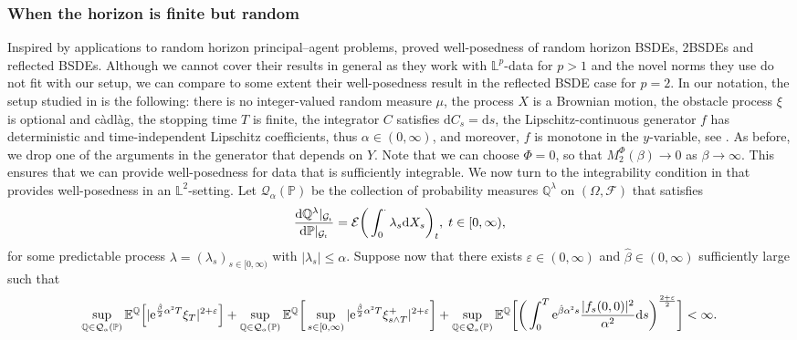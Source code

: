 \documentclass[10pt]{article} %
\newcommand\cE{\mathcal E}
\newcommand\cF{\mathcal F}
\newcommand\cG{\mathcal G}
\newcommand\cQ{\mathcal Q}
\newcommand{\smalltext}[1]{\text{\fontsize{4}{4}\selectfont$#1$}}
\def \E{\mathbb{E}}
\def \L{\mathbb{L}}
\def \P{\mathbb{P}}
\def \Q{\mathbb{Q}}
\newcommand{\1}{\mathbf{1}}
\def\d{\mathrm{d}}
\begin{document}
\subsubsection{When the horizon is finite but random}

Inspired by applications to random horizon principal--agent problems, \citeauthor*{lin2020second} \cite{lin2020second} proved well-posedness of random horizon BSDEs, 2BSDEs and reflected BSDEs. Although we cannot cover their results in general as they work with $\L^p$-data for $p > 1$ and the novel norms they use do not fit with our setup, we can compare to some extent their well-posedness result in the reflected BSDE case for $p = 2$. In our notation, the setup studied in \cite{lin2020second} is the following: there is no integer-valued random measure $\mu$, the process $X$ is a Brownian motion, the obstacle process $\xi$ is optional and c\`adl\`ag, the stopping time $T$ is finite, the integrator $C$ satisfies $\d C_s = \d s$, the Lipschitz-continuous generator $f$ has deterministic and time-independent Lipschitz coefficients, thus $\alpha \in (0,\infty)$, and moreover, $f$ is monotone in the $y$-variable, see \cite[Assumption 3.1.$(ii)$]{lin2020second}. As before, we drop one of the arguments in the generator that depends on $Y$. Note that we can choose $\Phi = 0$, so that $M^\Phi_2(\beta) \longrightarrow 0$ as $\beta \longrightarrow\infty$. This ensures that we can provide well-posedness for data that is sufficiently integrable. We now turn to the integrability condition in \cite{lin2020second} that provides well-posedness in an $\L^2$-setting. Let $\cQ_\alpha(\P)$ be the collection of probability measures $\Q^\lambda$ on $(\Omega,\cF)$ that satisfies
\begin{equation*}
	\frac{\d \Q^\lambda|_{\cG_\smalltext{t}}}{\d \P|_{\cG_\smalltext{t}}} = \cE\bigg(\int_0^\cdot \lambda_s \d X_s\bigg)_t, \; t \in [0,\infty),
\end{equation*}
for some predictable process $\lambda = (\lambda_s)_{s \in [0,\infty)}$ with $|\lambda_s| \leq \alpha$. Suppose now that there exists $\varepsilon \in (0,\infty)$ and $\hat\beta \in (0,\infty)$ sufficiently large such that 
\begin{equation*}
	\sup_{\Q \in \cQ_\smalltext{\alpha}(\P)}\E^\Q\Big[|\mathrm{e}^{\frac{\hat\beta}{2}\alpha^\smalltext{2} T}\xi_T|^{2+\varepsilon}\Big] + \sup_{\Q \in \cQ_\smalltext{\alpha}(\P)}\E^\Q\bigg[\sup_{s \in [0,\infty)}|\mathrm{e}^{\frac{\hat\beta}{2}\alpha^\smalltext{2} T}\xi^+_{s \land T}|^{2+\varepsilon}\bigg] + \sup_{\Q \in \cQ_\smalltext{\alpha}(\P)}\E^\Q\bigg[\bigg(\int_0^T\mathrm{e}^{\hat\beta\alpha^\smalltext{2} s}\frac{|f_s(0,0)|^2}{\alpha^2}\d s\bigg)^{\frac{2+\varepsilon}{2}}\bigg] < \infty.
\end{equation*}
\end{document}
